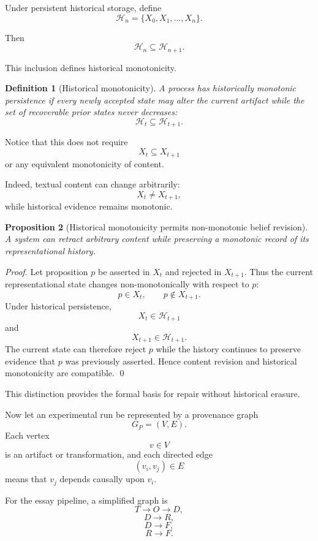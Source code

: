 \documentclass[11pt]{article}
\newtheorem{definition}{Definition}[section]
\newtheorem{proposition}[definition]{Proposition}
\begin{document}
Under persistent historical storage, define
\[
    \mathcal{H}_n
    =
    \{X_0,X_1,\ldots,X_n\}.
\]

Then
\[
    \mathcal{H}_{n}
    \subseteq
    \mathcal{H}_{n+1}.
\]

This inclusion defines historical monotonicity.

\begin{definition}[Historical monotonicity]
A process has historically monotonic persistence if every newly accepted state may alter the current artifact while the set of recoverable prior states never decreases:
\[
    \mathcal{H}_t
    \subseteq
    \mathcal{H}_{t+1}.
\]
\end{definition}

Notice that this does not require
\[
    X_t\subseteq X_{t+1}
\]
or any equivalent monotonicity of content.

Indeed, textual content can change arbitrarily:
\[
    X_t\neq X_{t+1},
\]
while historical evidence remains monotonic.

\begin{proposition}[Historical monotonicity permits non-monotonic belief revision]
A system can retract arbitrary content while preserving a monotonic record of its representational history.
\end{proposition}

\begin{proof}
Let proposition \(p\) be asserted in \(X_t\) and rejected in \(X_{t+1}\). Thus the current representational state changes non-monotonically with respect to \(p\):
\[
    p\in X_t,
    \qquad
    p\notin X_{t+1}.
\]
Under historical persistence,
\[
    X_t\in\mathcal{H}_{t+1}
\]
and
\[
    X_{t+1}\in\mathcal{H}_{t+1}.
\]
The current state can therefore reject \(p\) while the history continues to preserve evidence that \(p\) was previously asserted. Hence content revision and historical monotonicity are compatible. \qed
\end{proof}

This distinction provides the formal basis for repair without historical erasure.

Now let an experimental run be represented by a provenance graph
\[
    G_P=(V,E).
\]
Each vertex
\[
    v\in V
\]
is an artifact or transformation, and each directed edge
\[
    (v_i,v_j)\in E
\]
means that \(v_j\) depends causally upon \(v_i\).

For the essay pipeline, a simplified graph is
\[
    T\rightarrow O\rightarrow D,
\]
\[
    D\rightarrow R,
\]
\[
    D\rightarrow F,
\]
\[
    R\rightarrow F.
\]
\end{document}
